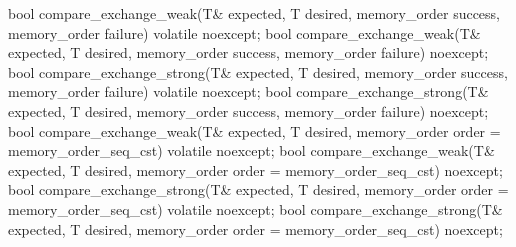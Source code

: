 %
%
%
%
%
%
%
%
%
%
\begin{itemdecl}
bool compare_exchange_weak(T& expected, T desired,
                           memory_order success, memory_order failure) volatile noexcept;
bool compare_exchange_weak(T& expected, T desired,
                           memory_order success, memory_order failure) noexcept;
bool compare_exchange_strong(T& expected, T desired,
                             memory_order success, memory_order failure) volatile noexcept;
bool compare_exchange_strong(T& expected, T desired,
                             memory_order success, memory_order failure) noexcept;
bool compare_exchange_weak(T& expected, T desired,
                           memory_order order = memory_order_seq_cst) volatile noexcept;
bool compare_exchange_weak(T& expected, T desired,
                           memory_order order = memory_order_seq_cst) noexcept;
bool compare_exchange_strong(T& expected, T desired,
                             memory_order order = memory_order_seq_cst) volatile noexcept;
bool compare_exchange_strong(T& expected, T desired,
                             memory_order order = memory_order_seq_cst) noexcept;
\end{itemdecl}

